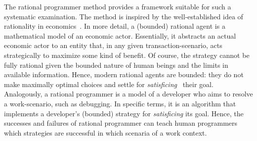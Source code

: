 The rational programmer method provides a framework suitable for such a
systematic examination. The method is inspired by the well-established
idea of rationality in economics~\cite{mill1874essays, henrich2001search}.
In more detail, a (bounded) rational agent is a mathematical model of an
economic actor. Essentially, it abstracts an actual economic actor to an
entity that, in any given transaction-scenario, acts strategically to
maximize some kind of benefit.  Of course, the strategy cannot be fully
rational given the bounded nature of human beings and the limits in
available information. Hence, modern rational agents are bounded: they do
not make maximally optimal choices and settle for
\emph{satisficing}~\cite{hs:satisfice} their goal. Analogously, a rational
programmer is a model of a developer who aims to resolve a work-scenario,
such as debugging. In specific terms, it is an algorithm that implements a
developer's (bounded) strategy for \emph{satisficing} its goal.  Hence,
the successes and failures of rational programmer can teach human
programmers which strategies are successful in which scenaria of a work
context.




